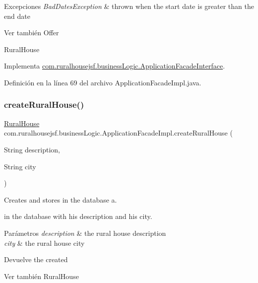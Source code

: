 \begin{DoxyExceptions}{Excepciones}
{\em Bad\+Dates\+Exception} & thrown when the start date is greater than the end date\\
\hline
\end{DoxyExceptions}
\begin{DoxySeeAlso}{Ver también}
Offer 

Rural\+House 
\end{DoxySeeAlso}


Implementa \mbox{\hyperlink{interfacecom_1_1ruralhousejsf_1_1business_logic_1_1_application_facade_interface_afaa6b314fb684fe1121f062481f2bcd9}{com.\+ruralhousejsf.\+business\+Logic.\+Application\+Facade\+Interface}}.



Definición en la línea 69 del archivo Application\+Facade\+Impl.\+java.

\mbox{\label{classcom_1_1ruralhousejsf_1_1business_logic_1_1_application_facade_impl_a48b82f812a30271878f50b99ae16a24b}} 
\subsubsection{\texorpdfstring{createRuralHouse()}{createRuralHouse()}}
{\footnotesize\ttfamily \mbox{\hyperlink{classcom_1_1ruralhousejsf_1_1domain_1_1_rural_house}{Rural\+House}} com.\+ruralhousejsf.\+business\+Logic.\+Application\+Facade\+Impl.\+create\+Rural\+House (\begin{DoxyParamCaption}\item[{String}]{description,  }\item[{String}]{city }\end{DoxyParamCaption})}



Creates and stores in the database a. 


\begin{DoxyCode}{0}
\end{DoxyCode}
 in the database with his description and his city.


\begin{DoxyParams}{Parámetros}
{\em description} & the rural house description \\
\hline
{\em city} & the rural house city\\
\hline
\end{DoxyParams}
\begin{DoxyReturn}{Devuelve}
the created
\begin{DoxyCode}{0}
\end{DoxyCode}

\end{DoxyReturn}
\begin{DoxySeeAlso}{Ver también}
Rural\+House 
\end{DoxySeeAlso}


